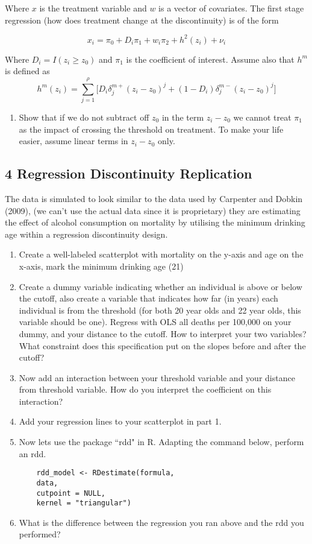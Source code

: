 \documentclass[11pt]{article}
\begin{document}
Where $x$ is the treatment variable and $w$ is a vector of covariates. The first stage regression (how does treatment change at the discontinuity) is of the form 

$$x_i = \pi_0 + D_i \pi_1 + w_i \pi_2 + h^2(z_i) + \nu_i$$

Where $D_i = I(z_i \ge z_0)$ and $\pi_1$ is the coefficient of interest. Assume also that $h^m$ is defined as
$$h^m(z_i) = \sum_{j=1}^\rho \bigg[D_i \delta_j^{m+}(z_i - z_0)^j + (1 - D_i) \delta_j^{m-}(z_i - z_0)^j \bigg]$$

\begin{enumerate}[label=\alph*)]
    \item Show that if we do not subtract off $z_0$ in the term $z_i - z_0$ we cannot treat $\pi_1$ as the impact of crossing the threshold on treatment. To make your life easier, assume linear terms in $z_i - z_0$ only.
\end{enumerate}

\subsection*{4 Regression Discontinuity Replication}
The data is simulated to look similar to the data used by Carpenter and Dobkin (2009), (we can't use the actual data since it is proprietary) they are estimating the effect of alcohol consumption on mortality by utilising the minimum drinking age within a regression discontinuity design. 



\begin{enumerate}[label=\alph*)]
    \item Create a well-labeled scatterplot with mortality on the y-axis and age on the x-axis, mark the minimum drinking age (21)
    \item Create a dummy variable indicating whether an individual is above or below the cutoff, also create a variable that indicates how far (in years) each individual is from the threshold (for both 20 year olds and 22 year olds, this variable should be one). Regress with OLS all deaths per 100,000 on  your  dummy, and your distance to the cutoff. How to interpret your two variables? What constraint does this specification put on the slopes before and after the cutoff?
    \item Now add an interaction between your threshold variable and your distance from threshold variable. How do you interpret the coefficient on this interaction?
    \item Add your regression lines to your scatterplot in part 1.
    \item Now lets use the package ``rdd" in R. Adapting the command below, perform an rdd.
    \begin{verbatim}
    rdd_model <- RDestimate(formula,
    data, 
    cutpoint = NULL,
    kernel = "triangular")
    \end{verbatim}
    \item What is the difference between the regression you ran above and the rdd you performed? 
\end{enumerate}
\end{document}
